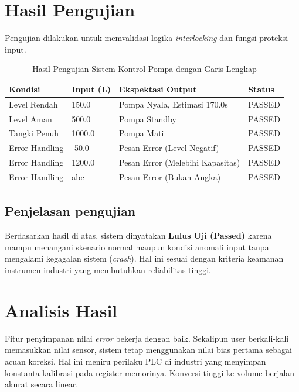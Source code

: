 \documentclass[12pt,a4paper]{article}
\begin{document}
\section{Hasil Pengujian}
Pengujian dilakukan untuk memvalidasi logika \textit{interlocking} dan fungsi proteksi input.
\begin{table}[h!]
\centering
\caption{Hasil Pengujian Sistem Kontrol Pompa dengan Garis Lengkap}
\vspace{0.2cm}
\begin{tabular}{|l|l|l|l|} %
\hline %
\textbf{Kondisi} & \textbf{Input (L)} & \textbf{Ekspektasi Output} & \textbf{Status} \\ \hline
Level Rendah   & 150.0  & Pompa Nyala, Estimasi 170.0s     & PASSED \\ \hline
Level Aman     & 500.0  & Pompa Standby                    & PASSED \\ \hline
Tangki Penuh   & 1000.0 & Pompa Mati                       & PASSED \\ \hline
Error Handling & -50.0  & Pesan Error (Level Negatif)      & PASSED \\ \hline
Error Handling & 1200.0 & Pesan Error (Melebihi Kapasitas) & PASSED \\ \hline
Error Handling & abc    & Pesan Error (Bukan Angka)        & PASSED \\ \hline
\end{tabular}
\end{table}

\subsection*{Penjelasan pengujian}
Berdasarkan hasil di atas, sistem dinyatakan \textbf{Lulus Uji (Passed)} karena mampu menangani skenario normal maupun kondisi anomali input tanpa mengalami kegagalan sistem (\textit{crash}). Hal ini sesuai dengan kriteria keamanan instrumen industri yang membutuhkan reliabilitas tinggi.

\section{Analisis Hasil}
Fitur penyimpanan nilai \textit{error} bekerja dengan baik. Sekalipun user berkali-kali memasukkan nilai sensor, sistem tetap menggunakan nilai bias pertama sebagai acuan koreksi. Hal ini meniru perilaku PLC di industri yang menyimpan konstanta kalibrasi pada register memorinya. Konversi tinggi ke volume berjalan akurat secara linear.
\end{document}
